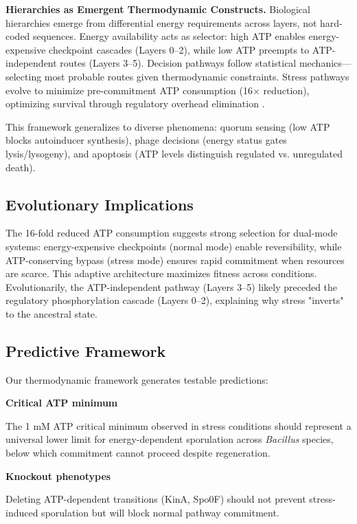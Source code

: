 \documentclass[twocolumn,11pt]{article}
\begin{document}
\textbf{Hierarchies as Emergent Thermodynamic Constructs.} Biological hierarchies emerge from differential energy requirements across layers, not hard-coded sequences. Energy availability acts as selector: high ATP enables energy-expensive checkpoint cascades (Layers 0--2), while low ATP preempts to ATP-independent routes (Layers 3--5). Decision pathways follow statistical mechanics—selecting most probable routes given thermodynamic constraints. Stress pathways evolve to minimize pre-commitment ATP consumption (16× reduction), optimizing survival through regulatory overhead elimination \citep{russell1995,setlow2006}.

This framework generalizes to diverse phenomena: quorum sensing (low ATP blocks autoinducer synthesis), phage decisions (energy status gates lysis/lysogeny), and apoptosis (ATP levels distinguish regulated vs. unregulated death).


\subsection{Evolutionary Implications}

The 16-fold reduced ATP consumption suggests strong selection for dual-mode systems: energy-expensive checkpoints (normal mode) enable reversibility, while ATP-conserving bypass (stress mode) ensures rapid commitment when resources are scarce. This adaptive architecture maximizes fitness across conditions. Evolutionarily, the ATP-independent pathway (Layers 3--5) likely preceded the regulatory phosphorylation cascade (Layers 0--2), explaining why stress "inverts" to the ancestral state.

\subsection{Predictive Framework}

Our thermodynamic framework generates testable predictions:

\textbf{Critical ATP minimum}

The 1 mM ATP critical minimum observed in stress conditions should represent a universal lower limit for energy-dependent sporulation across \textit{Bacillus} species, below which commitment cannot proceed despite regeneration.

\textbf{Knockout phenotypes}

Deleting ATP-dependent transitions (KinA, Spo0F) should not prevent stress-induced sporulation but will block normal pathway commitment.
\end{document}
